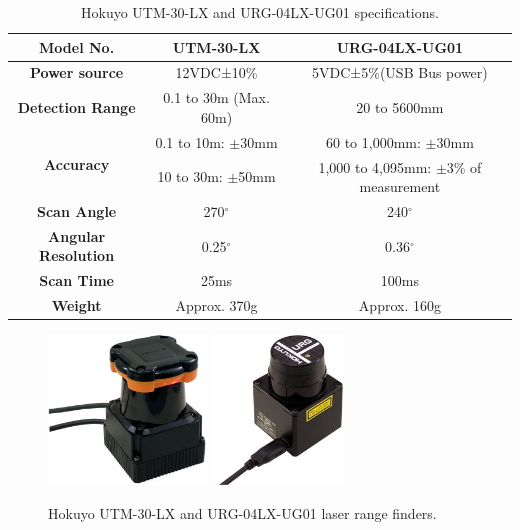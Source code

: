 \begin{table}[h!]
\begin{tabular}{|c|c|c|}
\hline \bf{Model No.}& \bf{UTM-30-LX} & \bf{URG-04LX-UG01} \\
\hline \bf{Power source} & 12VDC±10\% & 5VDC±5\%(USB Bus power) \\
\hline \bf{Detection Range} & 0.1 to 30m (Max. 60m) & 20 to 5600mm \\
\hline \multirow{2}{*}{\bf{Accuracy}}
& 0.1 to 10m: $\pm$30mm  & 60 to 1,000mm: $\pm$30mm \\
& 10 to 30m: $\pm$50mm & 1,000 to 4,095mm: $\pm$3\% of measurement \\
\hline \bf{Scan Angle} & 270$^{\circ}$ & 240$^{\circ}$ \\
\hline \bf{Angular Resolution} & 0.25$^{\circ}$ & 0.36$^{\circ}$ \\
\hline \bf{Scan Time} & 25ms  & 100ms \\
\hline \bf{Weight} & Approx. 370g  & Approx. 160g \\
\hline
\end{tabular}
\caption{Hokuyo UTM-30-LX and URG-04LX-UG01 specifications.}
\end{table}


\begin{figure}[h!]
\begin{center}
\includegraphics[height=4cm]{fig/utm30lx.jpg}
\includegraphics[height=4cm]{fig/urg04lxug01.jpg}
\end{center}
\caption{Hokuyo UTM-30-LX and URG-04LX-UG01 laser range finders.}
\label{fig:laserscans}
\end{figure}

